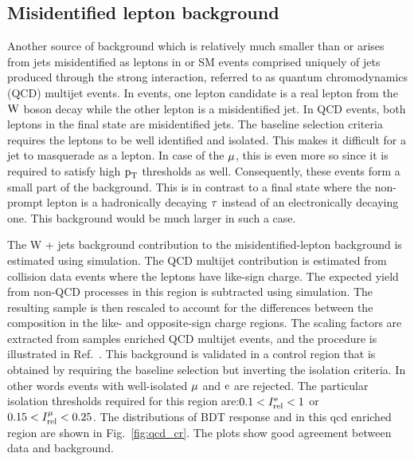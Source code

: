 \subsection{Misidentified lepton background}
\label{h125_misid_bg}
Another source of background which is relatively much smaller than \ttb or \ztt arises from jets misidentified as leptons in \wjets or SM events comprised uniquely of jets produced through the strong interaction, referred to as quantum chromodynamics (QCD) multijet events. In \wjets events, one lepton candidate is a real lepton from the $\text{W}$ boson decay while the other lepton is a misidentified jet. In QCD events, both leptons in the final state are misidentified jets. The baseline selection criteria requires the leptons to be well identified and isolated. This makes it difficult for a jet to masquerade as a lepton. In case of the $\mu$, this is even more so since it is required to satisfy high $\text{p}_\text{T}$ thresholds as well. Consequently, these events form a small part of the background. This is in contrast to a final state where the non-prompt lepton is a hadronically decaying $\tau$ instead of an electronically decaying one. This background would be much larger in such a case.

The W + jets background contribution to the misidentified-lepton background is estimated using simulation. The QCD multijet contribution is estimated from collision data events where the leptons have like-sign charge. The expected yield from non-QCD processes in this region is subtracted using simulation. The resulting sample is then rescaled to account for the differences between the composition in the like- and opposite-sign charge regions. The scaling factors are extracted from samples enriched  QCD multijet events, and the procedure is illustrated in Ref.~\cite{}. This background is validated in a control region that is obtained by requiring the baseline selection but inverting the isolation criteria. In other words events with well-isolated $\mu$ and $\text{e}$ are rejected. The particular isolation thresholds required for this region are:$0.1 < I_\text{rel}^{\text{e}} < 1$ or $0.15 < I_\text{rel}^{\mu} < 0.25$. The distributions of BDT response and \mcol in this qcd enriched region are shown in Fig.~\ref{fig:qcd_cr}. The plots show good agreement between data and background.



